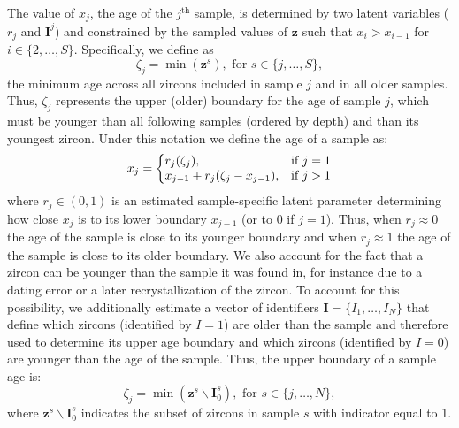 \documentclass[12pt,letterpaper]{article}
\begin{document}
The value of $x_j$, the age of the $j^{\text{th}}$ sample, is determined by two latent variables ($r_j$ and $\mathbf{I}^j$) and constrained by the sampled values of $\mathbf{z}$ such that $x_{i} > x_{i - 1}$ for $i \in \{2, \dots, S\}$.
Specifically, we define as 
\begin{equation}
\zeta_j = \min(\mathbf{z}^{s}), \text{ for } s \in \{j, \dots, S\},
\end{equation}
the minimum age across all zircons included in sample $j$ and in all older samples. 
Thus, $\zeta_j$ represents the upper (older) boundary for the age of sample $j$, which must be younger than all following samples (ordered by depth) and than its youngest zircon.
Under this notation we define the age of a sample as: 
\begin{equation}
x_j = \left\{
\begin{array}{@{}ll@{}}
    r_j (\zeta_j), & \text{if}\ j = 1 \\
    x_{j - 1} + r_j (\zeta_j - x_{j - 1}), & \text{if}\ j > 1 \\
\end{array}\right.
\label{x_constraint}
\end{equation}
where $r_j \in (0, 1)$ is an estimated sample-specific latent parameter determining how close $x_{j}$ is to its lower boundary $x_{j - 1}$ (or to 0 if $j = 1$). 
Thus, when $r_j \approx 0$ the age of the sample is close to its younger boundary and when $r_j \approx 1$ the age of the sample is close to its older boundary. 
%
We also account for the fact that a zircon can be younger than the sample it was found in, for instance due to a dating error or a later recrystallization of the zircon. 
To account for this possibility, we additionally estimate a vector of identifiers $\mathbf{I} = \{I_1, \dots, I_N\}$ that define which zircons (identified by $I = 1$) are older than the sample and therefore used to determine  its upper age boundary  and which zircons (identified by $I = 0$) are younger than the age of the sample. 
Thus, the upper boundary of a sample age is:
\begin{equation}
\zeta_j = \min(\mathbf{z}^{s} \backslash \mathbf{I}^s_0), \text{ for } s \in \{j, \dots, N \}, 
\end{equation}
where $\mathbf{z}^{s} \backslash \mathbf{I}^s_0$ indicates the subset of zircons in sample $s$ with indicator equal to 1. 
\end{document}
